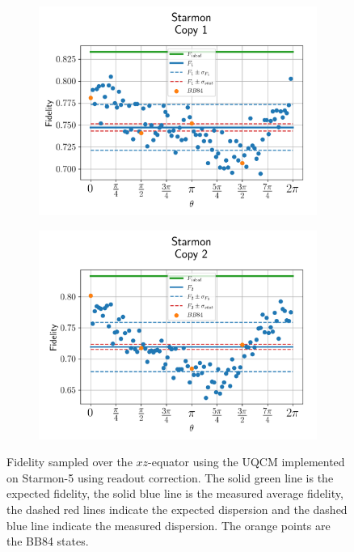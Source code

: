 \begin{figure}[H]
    \centering
    \begin{subfigure}{.45\textwidth}
      \centering
      \includegraphics[width=\textwidth]{Figures/UQCM/Starmon/OnlyEquator/results_corrected_starmon5_copy1.png}
    \end{subfigure}%
    \begin{subfigure}{.45\textwidth}
      \centering
      \includegraphics[width=\textwidth]{Figures/UQCM/Starmon/OnlyEquator/results_corrected_starmon5_copy2.png}
    \end{subfigure}
    \caption{Fidelity sampled over the $xz$-equator using the UQCM implemented on Starmon-5 using readout correction. The solid green line is the expected fidelity, the solid blue line is the measured average fidelity, the dashed red lines indicate the expected dispersion and the dashed blue line indicate the measured dispersion. The orange points are the BB84 states.}
    \label{fig:uqcm_eq_starmon}
\end{figure}

